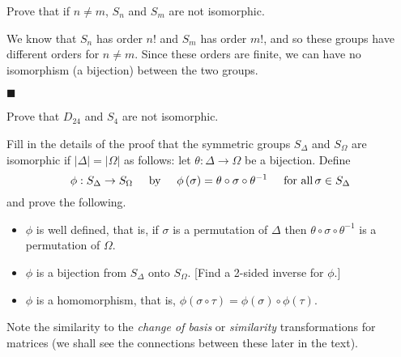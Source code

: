 \documentclass[12pt]{article}
\renewcommand{\qed}{\hfill$\blacksquare$}
\renewenvironment{proof}{\begin{addmargin}[1em]{0em}\begin{newproof}}{\end{newproof}\end{addmargin}\qed}
\newenvironment{problem}[2][Exercise]{\begin{trivlist}
\item[\hskip \labelsep {\bfseries #1}\hskip \labelsep {\bfseries #2.}]}{\end{trivlist}}
\begin{document}
\begin{problem}{1.6.8}
Prove that if $n\neq m$, $S_n$ and $S_m$ are not isomorphic.
\end{problem}
\begin{proof}
    We know that $S_n$ has order $n!$ and $S_m$ has order $m!$, and so these groups have different orders for $n\neq m$. Since these orders are finite, we can have no isomorphism (a bijection) between the two groups.
\end{proof}


\begin{problem}{1.6.9}
Prove that $D_{24}$ and $S_4$ are not isomorphic.
\end{problem}


\begin{problem}{1.6.10}
Fill in the details of the proof that the symmetric groups $S_{\Delta}$ and $S_{\Omega}$ are isomorphic if $\left|\Delta\right| = \left|\Omega\right|$ as follows: let $\theta:\Delta\rightarrow \Omega$ be a bijection. Define
$$ \phi:S_{\Delta}\rightarrow S_{\Omega} \hspace{5mm} \text{by} \hspace{5mm} \phi\left(\sigma\right)=\theta \circ \sigma \circ \theta^{-1} \hspace{5mm} \text{for all} \, \sigma \in S_{\Delta} $$ and prove the following.
\begin{itemize}
    \item $\phi$ is well defined, that is, if $\sigma$ is a permutation of $\Delta$ then $\theta \circ \sigma \circ \theta^{-1}$ is a permutation of $\Omega$.
    \item $\phi$ is a bijection from $S_{\Delta}$ onto $S_{\Omega}$. [Find a 2-sided inverse for $\phi$.]
    \item $\phi$ is a homomorphism, that is, $\phi\left(\sigma \circ \tau\right)=\phi\left(\sigma\right)\circ \phi\left(\tau\right)$.
\end{itemize}
Note the similarity to the \textit{change of basis} or \textit{similarity} transformations for matrices (we shall see the connections between these later in the text).
\end{problem}
\end{document}
